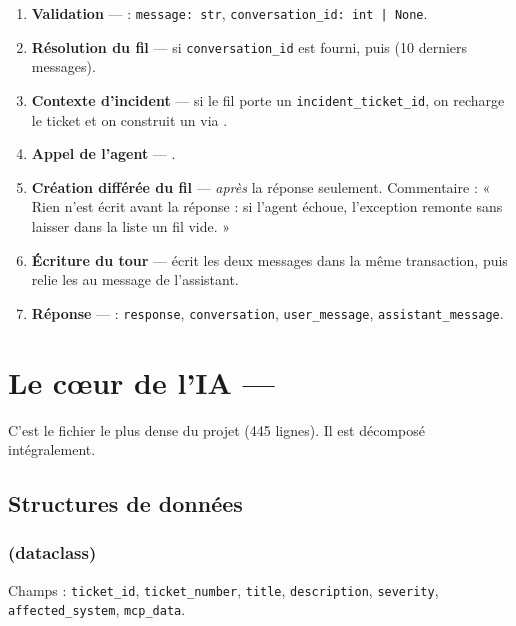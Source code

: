 \begin{enumerate}
  \item \textbf{Validation} ---  : \texttt{message: str},
  \texttt{conversation\_id: int | None}.
  \item \textbf{Résolution du fil} --- si \texttt{conversation\_id} est fourni,
   puis  (10
  derniers messages).
  \item \textbf{Contexte d'incident} --- si le fil porte un
  \texttt{incident\_ticket\_id}, on recharge le ticket et on construit un
   via .
  \item \textbf{Appel de l'agent} ---
  .
  \item \textbf{Création différée du fil} --- \emph{après} la réponse
  seulement. Commentaire : « Rien n'est écrit avant la réponse : si l'agent
  échoue, l'exception remonte sans laisser dans la liste un fil vide. »
  \item \textbf{Écriture du tour} ---  écrit les
  deux messages dans la même transaction, puis  relie les
   au message de l'assistant.
  \item \textbf{Réponse} ---  : \texttt{response},
  \texttt{conversation}, \texttt{user\_message}, \texttt{assistant\_message}.
\end{enumerate}

\section{Le cœur de l'IA --- }

C'est le fichier le plus dense du projet (445 lignes). Il est décomposé
intégralement.

\subsection{Structures de données}

\subsubsection*{ (dataclass)}
Champs : \texttt{ticket\_id}, \texttt{ticket\_number}, \texttt{title},
\texttt{description}, \texttt{severity}, \texttt{affected\_system},
\texttt{mcp\_data}.

